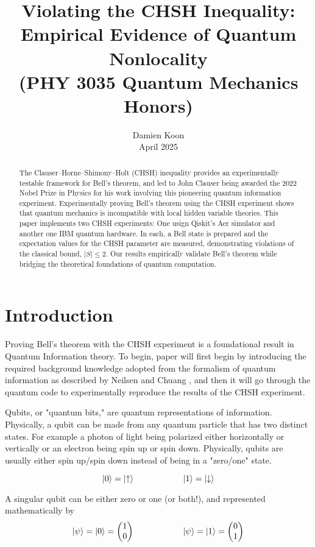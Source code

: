 \documentclass[12pt]{article}
\title{Violating the CHSH Inequality: \\ Empirical Evidence of Quantum Nonlocality \\ (PHY 3035 Quantum Mechanics Honors)}
\author{Damien Koon\\[0.5em]
April 2025} %
\date{} %
\makeatletter
\renewcommand\tableofcontents{%
  \null\hfill\textbf{\Large\contentsname}\hfill\null\par
  \@mkboth{\MakeUppercase\contentsname}{\MakeUppercase\contentsname}%
  \@starttoc{toc}%
}
\makeatother
\begin{document}
\maketitle

\begin{abstract}
The Clauser–Horne–Shimony–Holt (CHSH) inequality provides an experimentally testable framework for Bell's theorem, and led to John Clauser being awarded the 2022 Nobel Prize in Physics for his work involving this pioneering quantum information experiment. Experimentally proving Bell's theorem using the CHSH experiment shows that quantum mechanics is incompatible with local hidden variable theories. This paper implements two CHSH experiments: One usign Qiskit's Aer simulator and another one IBM quantum hardware. In each, a Bell state is prepared and the expectation values for the CHSH parameter are measured, demonstrating violations of the classical bound, $|S| \leq 2$. Our results empirically validate Bell's theorem while bridging the theoretical foundations of quantum computation.
\end{abstract}

\newpage
\tableofcontents
\newpage
\section{Introduction}

Proving Bell's theorem with the CHSH experiment is a foundational result in Quantum Information theory. To begin, paper will first begin by introducing the required background knowledge adopted from the  formalism of quantum information as described by Neilsen and Chuang \cite{Quantum_Information}, and then it will go through the quantum code to experimentally reproduce the results of the CHSH experiment. 

Qubits, or "quantum bits," are quantum representations of information. Physically, a qubit can be made from any quantum particle that has two distinct states. For example a photon of light being polarized either horizontally or vertically or an electron being spin up or spin down. Physically, qubits are usually either spin up/spin down instead of being in a "zero/one" state.

$$
\ket{0} = \ket{\uparrow} \hspace{2cm} \ket{1} = \ket{\downarrow}
$$


A singular qubit can be either zero or one (or both!), and represented mathematically by
$$
\ket{\psi} = \ket{0} = \begin{pmatrix} 1 \\ 0 \end{pmatrix} \hspace{2cm} \ket{\psi} = \ket{1} = \begin{pmatrix} 0 \\ 1 \end{pmatrix}
$$
\end{document}
